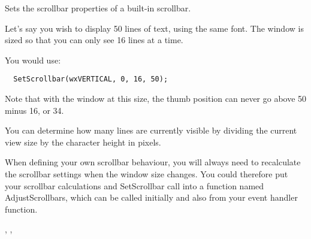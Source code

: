 Sets the scrollbar properties of a built-in scrollbar.








Let's say you wish to display 50 lines of text, using the same font.
The window is sized so that you can only see 16 lines at a time.

You would use:

{\small%
\begin{verbatim}
  SetScrollbar(wxVERTICAL, 0, 16, 50);
\end{verbatim}
}

Note that with the window at this size, the thumb position can never go
above 50 minus 16, or 34.

You can determine how many lines are currently visible by dividing the current view
size by the character height in pixels.

When defining your own scrollbar behaviour, you will always need to recalculate
the scrollbar settings when the window size changes. You could therefore put your
scrollbar calculations and SetScrollbar
call into a function named AdjustScrollbars, which can be called initially and also
from your  event handler function.


,\rtfsp
{}, 

